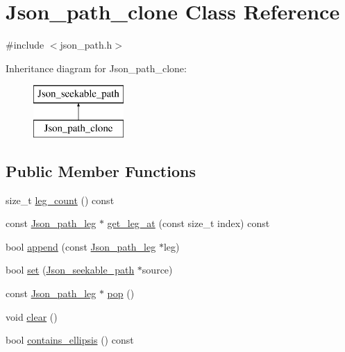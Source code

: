 \hypertarget{classJson__path__clone}{}\section{Json\+\_\+path\+\_\+clone Class Reference}
\label{classJson__path__clone}


{\ttfamily \#include $<$json\+\_\+path.\+h$>$}

Inheritance diagram for Json\+\_\+path\+\_\+clone\+:\begin{figure}[H]
\begin{center}
\leavevmode
\includegraphics[height=2.000000cm]{classJson__path__clone}
\end{center}
\end{figure}
\subsection*{Public Member Functions}
\begin{DoxyCompactItemize}
\item 
size\+\_\+t \mbox{\hyperlink{classJson__path__clone_a7b3217b45baaa958cc2a48a1e03bbe31}{leg\+\_\+count}} () const
\item 
const \mbox{\hyperlink{classJson__path__leg}{Json\+\_\+path\+\_\+leg}} $\ast$ \mbox{\hyperlink{classJson__path__clone_afc7f1eee2eb7e50ab90c0a52dd2e7fa4}{get\+\_\+leg\+\_\+at}} (const size\+\_\+t index) const
\item 
bool \mbox{\hyperlink{classJson__path__clone_a10400af44b31abfc2a77c7feedc954c0}{append}} (const \mbox{\hyperlink{classJson__path__leg}{Json\+\_\+path\+\_\+leg}} $\ast$leg)
\item 
bool \mbox{\hyperlink{classJson__path__clone_aa9a9fa559013cddfa0f1096b72a917e0}{set}} (\mbox{\hyperlink{classJson__seekable__path}{Json\+\_\+seekable\+\_\+path}} $\ast$source)
\item 
const \mbox{\hyperlink{classJson__path__leg}{Json\+\_\+path\+\_\+leg}} $\ast$ \mbox{\hyperlink{classJson__path__clone_afbf830602783d78bb7283fcaf35e7d9e}{pop}} ()
\item 
void \mbox{\hyperlink{classJson__path__clone_a85503f72b0c86c105fa2573e4fdb2d47}{clear}} ()
\item 
bool \mbox{\hyperlink{classJson__path__clone_ab1c40c5424e17ba7dddaf168c36fbced}{contains\+\_\+ellipsis}} () const
\end{DoxyCompactItemize}


